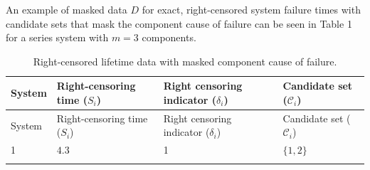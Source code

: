 \documentclass[
]{article}
\begin{document}
An example of masked data \(D\) for exact, right-censored system failure
times with candidate sets that mask the component cause of failure can
be seen in Table 1 for a series system with \(m=3\) components.

\begin{longtable}[]{@{}llll@{}}
\caption{Right-censored lifetime data with masked component cause of
failure.}\tabularnewline
\toprule
\begin{minipage}[b]{0.07\columnwidth}\raggedright
System\strut
\end{minipage} & \begin{minipage}[b]{0.30\columnwidth}\raggedright
Right-censoring time (\(S_i\))\strut
\end{minipage} & \begin{minipage}[b]{0.30\columnwidth}\raggedright
Right censoring indicator (\(\delta_i\))\strut
\end{minipage} & \begin{minipage}[b]{0.23\columnwidth}\raggedright
Candidate set (\(\mathcal{C}_i\))\strut
\end{minipage}\tabularnewline
\midrule
\endfirsthead
\toprule
\begin{minipage}[b]{0.07\columnwidth}\raggedright
System\strut
\end{minipage} & \begin{minipage}[b]{0.30\columnwidth}\raggedright
Right-censoring time (\(S_i\))\strut
\end{minipage} & \begin{minipage}[b]{0.30\columnwidth}\raggedright
Right censoring indicator (\(\delta_i\))\strut
\end{minipage} & \begin{minipage}[b]{0.23\columnwidth}\raggedright
Candidate set (\(\mathcal{C}_i\))\strut
\end{minipage}\tabularnewline
\midrule
\endhead
\begin{minipage}[t]{0.07\columnwidth}\raggedright
1\strut
\end{minipage} & \begin{minipage}[t]{0.30\columnwidth}\raggedright
\(4.3\)\strut
\end{minipage} & \begin{minipage}[t]{0.30\columnwidth}\raggedright
1\strut
\end{minipage} & \begin{minipage}[t]{0.23\columnwidth}\raggedright
\(\{1,2\}\)\strut
\end{minipage}\tabularnewline
\begin{minipage}[t]{0.07\columnwidth}\raggedright

\end{minipage}
\end{longtable}
\end{document}
